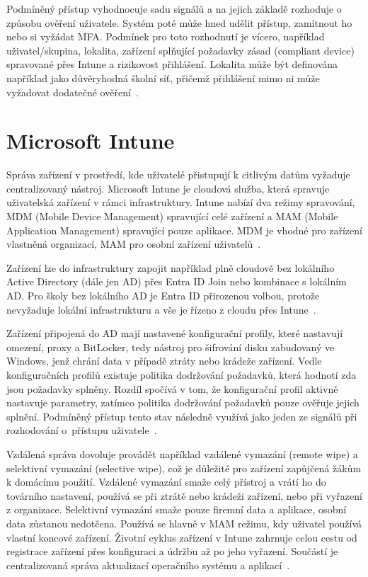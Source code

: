 \documentclass[male,czech,api_bc]{kitheses}
\begin{document}
Podmíněný přístup vyhodnocuje sadu signálů a na jejich základě rozhoduje o způsobu ověření uživatele. Systém poté může hned udělit přístup, zamítnout ho nebo si vyžádat MFA. Podmínek pro toto rozhodnutí je vícero, například uživatel/skupina, lokalita, zařízení splňující požadavky zásad (compliant device) spravované přes Intune a rizikovost přihlášení. Lokalita může být definována například jako důvěryhodná školní síť, přičemž přihlášení mimo ni může vyžadovat dodatečné ověření~\cite{MicrosoftEntra2025}.

\section{Microsoft Intune}
Správa zařízení v prostředí, kde uživatelé přistupují k citlivým datům vyžaduje centralizovaný nástroj. Microsoft Intune je cloudová služba, která spravuje uživatelská zařízení v rámci infrastruktury. Intune nabízí dva režimy spravování, MDM (Mobile Device Management) spravující celé zařízení a MAM (Mobile Application Management) spravující pouze aplikace. MDM je vhodné pro zařízení vlastněná organizací, MAM pro osobní zařízení uživatelů~\cite{MicrosoftIntune2025}.

Zařízení lze do infrastruktury zapojit například plně cloudově bez lokálního Active Directory (dále jen AD) přes Entra ID Join nebo kombinace s lokálním AD. Pro školy bez lokálního AD je Entra ID přirozenou volbou, protože nevyžaduje lokální infrastrukturu a vše je řízeno z cloudu přes Intune~\cite{MicrosoftIntune2025}.

Zařízení připojená do AD mají nastavené konfigurační profily, které nastavují omezení, proxy a BitLocker, tedy nástroj pro šifrování disku zabudovaný ve Windows, jenž chrání data v případě ztráty nebo krádeže zařízení. Vedle konfiguračních profilů existuje politika dodržování požadavků, která hodnotí zda jsou požadavky splněny. Rozdíl spočívá v tom, že konfigurační profil aktivně nastavuje parametry, zatímco politika dodržování požadavků pouze ověřuje jejich splnění. Podmíněný přístup tento stav následně využívá jako jeden ze signálů při rozhodování o~přístupu uživatele~\cite{MicrosoftIntune2025}.

Vzdálená správa dovoluje provádět například vzdálené vymazání (remote wipe) a selektivní vymazání (selective wipe), což je důležité pro zařízení zapůjčená žákům k domácímu použití. Vzdálené vymazání smaže celý přístroj a vrátí ho do továrního nastavení, používá se při ztrátě nebo krádeži zařízení, nebo při vyřazení z organizace. Selektivní vymazání smaže pouze firemní data a aplikace, osobní data zůstanou nedotčena. Používá se hlavně v MAM režimu, kdy uživatel používá vlastní koncové zařízení. Životní cyklus zařízení v Intune zahrnuje celou cestu od registrace zařízení přes konfiguraci a údržbu až po jeho vyřazení. Součástí je centralizovaná správa aktualizací operačního systému a aplikací~\cite{MicrosoftIntune2025}.
\end{document}
